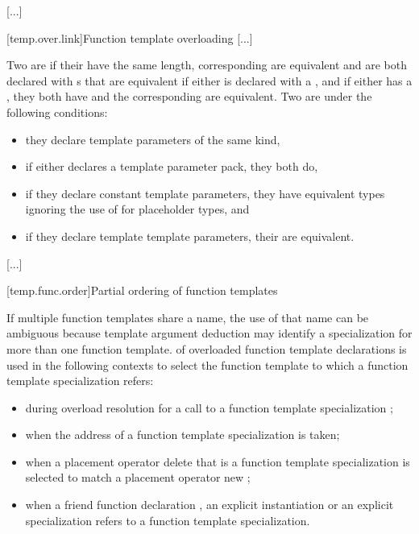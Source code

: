 \documentclass{wg21}
\begin{document}
\textcolor{noteclr}{[...]}

[temp.over.link]{Function template overloading}
\textcolor{noteclr}{[...]}

\pnum
Two  are
 if
their  have the same length,
corresponding  are equivalent
and are both declared with s that are equivalent
if either 
is declared with a ,
and if either  has a ,
they both have
 and the corresponding
 are equivalent.
Two  are
under the following conditions:
\begin{itemize}
    \item they declare template parameters of the same kind,
    \item if either declares a template parameter pack, they both do,
    \item if they declare constant template parameters,
    they have equivalent types
    ignoring the use of  for placeholder types, and
    \item if they declare template template parameters, their  are equivalent.
\end{itemize}
\textcolor{noteclr}{[...]}

[temp.func.order]{Partial ordering of function templates}

\pnum
{}%
%
If multiple function templates share a name,
the use of that name can be ambiguous because
template argument deduction  may identify
a specialization for more than one function template.
of overloaded function template declarations is used in the following contexts
to select the function template to which a function template specialization
refers:
\begin{itemize}
    \item
    during overload resolution for a call to a function template specialization ;
    \item
    when the address of a function template specialization is taken;
    \item
    when a placement operator delete that is a
    function template
    specialization
    is selected to match a placement operator new
    ;
    \item
    when a friend function declaration , an
    explicit instantiation  or an explicit specialization  refers to
    a function template specialization.
\end{itemize}
\end{document}
